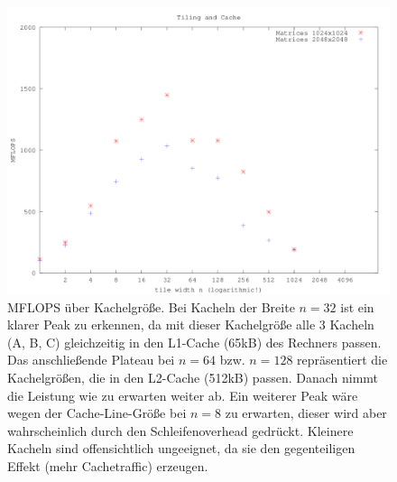 \documentclass[11pt,a4paper]{scrartcl}
\begin{document}
\begin{figure}[ht]
\centering
 \includegraphics[width=.85\linewidth]{tiled.png}
 \caption{MFLOPS über Kachelgröße. Bei Kacheln der Breite $n=32$ ist ein klarer Peak zu erkennen, da mit dieser Kachelgröße alle 3 Kacheln (A, B, C) gleichzeitig in den L1-Cache (65kB) des Rechners passen. 
 Das anschließende Plateau bei $n=64$ bzw. $n=128$ repräsentiert die Kachelgrößen, die in den L2-Cache (512kB) passen. Danach nimmt die Leistung wie zu erwarten weiter ab. Ein weiterer Peak wäre wegen der 
 Cache-Line-Größe bei $n=8$ zu erwarten, dieser wird aber wahrscheinlich durch den Schleifenoverhead gedrückt. Kleinere Kacheln sind offensichtlich ungeeignet, da sie den gegenteiligen Effekt (mehr Cachetraffic) erzeugen.}
 \label{fig:tiled}
\end{figure}





% 
%
\end{document}
